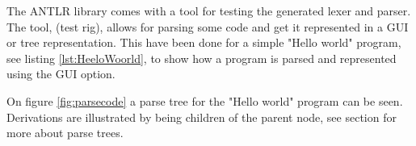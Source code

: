 The ANTLR library comes with a tool for testing the generated lexer and parser. The tool, (test rig), allows for parsing some code and get it represented
in a GUI or tree representation. This have been done for a simple "Hello world" program, see listing \ref{lst:HeeloWoorld}, to show how a program is parsed and represented using the GUI option.


On figure \ref{fig:parsecode} a parse tree for the "Hello world" program can be seen. Derivations are illustrated by being children of the parent node, see section  for more about parse trees.